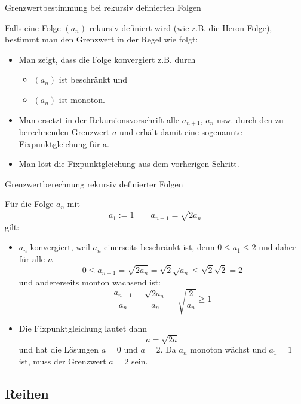 \begin{frame}{Grenzwertbestimmung bei rekursiv definierten Folgen}
	\begin{bemerkung}
	Falls eine Folge $(a_{n})$ rekursiv definiert wird (wie z.B. die Heron-Folge), bestimmt man den Grenzwert in der Regel wie folgt:
	\begin{itemize}
		\item Man zeigt, dass die Folge konvergiert z.B. durch
		\begin{itemize}
			\item $(a_{n})$ ist beschränkt und
			\item $(a_{n})$ ist monoton.
		\end{itemize}
		\item Man ersetzt in der Rekursionsvorschrift alle $a_{n+1}$, $a_{n}$ usw. durch den zu berechnenden Grenzwert $a$ und erhält damit eine sogenannte Fixpunktgleichung für a.
		\item Man löst die Fixpunktgleichung aus dem vorherigen Schritt.
 	\end{itemize}
	\end{bemerkung}
\end{frame}

\begin{frame}{Grenzwertberechnung rekursiv definierter Folgen}
	\footnotesize{
	\begin{example}
		Für die Folge $a_{n}$ mit
		\[
			a_{1} := 1 \qquad a_{n+1} = \sqrt{2 a_{n}}
		\]
		gilt:
		\begin{itemize}
			\item $a_{n}$ konvergiert, weil $a_{n}$ einerseits beschränkt ist, denn $0  \leq a_{1} \leq 2$ und daher für alle $n$
			\[
				0 \leq a_{n+1} = \sqrt{2 a_{n}} = \sqrt{2} \sqrt{a_{n}} \leq \sqrt{2} \sqrt{2} = 2 
			\]
			und andererseits monton wachsend ist:
			\[
				\frac{a_{n+1}}{a_{n}} = \frac{\sqrt{2a_{n}}}{a_{n}} = \sqrt{\frac{2}{a_{n}}} \geq 1
			\]
			\item Die Fixpunktgleichung lautet dann
			\[
				a = \sqrt{2a}
			\] 
			und hat die Lösungen $a=0$ und $a=2$. Da $a_{n}$ monoton wächst und $a_{1} = 1$ ist, muss der Grenzwert $a=2$ sein.
		\end{itemize}
	\end{example}
}
\end{frame}

\subsection{Reihen}

